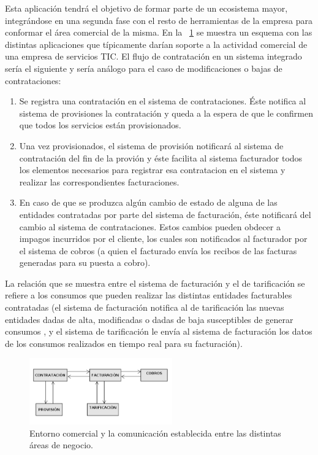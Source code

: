 Esta aplicación tendrá el objetivo de formar parte de un ecosistema mayor, integrándose en una segunda fase con el resto de herramientas de la empresa para conformar el área comercial de la misma. En la \figurename~\ref{fig:area-comercial} se muestra un esquema con las distintas aplicaciones que típicamente darían soporte a la actividad comercial de una empresa de servicios TIC. El flujo de contratación en un sistema integrado sería el siguiente y sería análogo para el caso de modificaciones o bajas de contrataciones:
\begin{enumerate}
\item Se registra una contratación en el sistema de contrataciones. Éste notifica al sistema de provisiones la contratación y queda a la espera de que le confirmen que todos los servicios están provisionados. 
\item Una vez provisionados, el sistema de provisión notificará al sistema de contratación del fin de la provión y éste facilita al sistema facturador todos los elementos necesarios para registrar esa contratacion en el sistema y realizar las correspondientes facturaciones. 
\item En caso de que se produzca algún cambio de estado de alguna de las entidades contratadas por parte del sistema de facturación, éste notificará del cambio al sistema de contrataciones. Estos cambios pueden obdecer a impagos incurridos por el cliente, los cuales son notificados al facturador por el sistema de cobros (a quien el facturado envía los recibos de las facturas generadas para su puesta a cobro).
\end{enumerate}

La relación que se muestra entre el sistema de facturación y el de tarificación se refiere a los consumos que pueden realizar las distintas entidades facturables contratadas (el sistema de facturación notifica al de tarificación las nuevas entidades dadas de alta, modificadas o dadas de baja susceptibles de generar consumos , y el sistema de tarificación le envía al sistema de facturación los datos de los consumos realizados en tiempo real para su facturación).


\begin{figure}
  \centering
  \includegraphics[width=0.55\textwidth]{imaxes/area-comercial.png}
  \caption{Entorno comercial y la comunicación establecida entre las distintas áreas de negocio.}
  \label{fig:area-comercial}
\end{figure}


